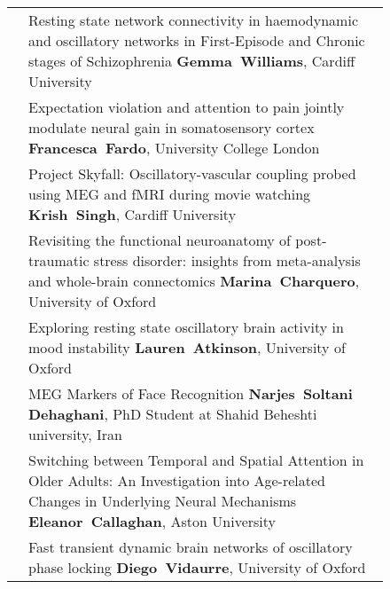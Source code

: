 \begin{figure}[htp]
\begin{tabularx}{\textwidth}{lp{.92\linewidth}}
\cellcolor{set2!50}{\bf A-31} & {\footnotesize Resting state network connectivity in haemodynamic and oscillatory networks in First-Episode and Chronic stages of Schizophrenia
} {\bf\footnotesize Gemma~Williams}, {\footnotesize Cardiff University}  \\
\cellcolor{set1!50}{\bf A-32} & {\footnotesize Expectation violation and attention to pain jointly modulate neural gain in somatosensory cortex} {\bf\footnotesize Francesca~Fardo}, {\footnotesize University College London}  \\
\cellcolor{set1!50}{\bf A-33} & {\footnotesize Project Skyfall: Oscillatory-vascular coupling probed using MEG and fMRI during movie watching} {\bf\footnotesize Krish~Singh}, {\footnotesize Cardiff University}  \\
\cellcolor{set2!50}{\bf A-34} & {\footnotesize Revisiting the functional neuroanatomy of post-traumatic stress disorder: insights from meta-analysis and whole-brain connectomics} {\bf\footnotesize Marina~Charquero}, {\footnotesize University of Oxford}  \\
\cellcolor{set2!50}{\bf A-35} & {\footnotesize Exploring resting state oscillatory brain activity in mood instability
} {\bf\footnotesize Lauren~Atkinson}, {\footnotesize University of Oxford}  \\
\cellcolor{set1!50}{\bf A-36} & {\footnotesize MEG Markers of Face Recognition
} {\bf\footnotesize Narjes~Soltani Dehaghani}, {\footnotesize PhD Student at Shahid Beheshti university, Iran}  \\
\cellcolor{set1!50}{\bf A-37} & {\footnotesize Switching between Temporal and Spatial Attention in Older Adults: An Investigation into Age-related Changes in Underlying Neural Mechanisms
} {\bf\footnotesize Eleanor~Callaghan}, {\footnotesize Aston University}  \\
\cellcolor{set3!50}{\bf A-38} & {\footnotesize Fast transient dynamic brain networks of oscillatory phase locking 
} {\bf\footnotesize Diego~Vidaurre}, {\footnotesize University of Oxford}  \\
\bottomrule
\end{tabularx}
\end{figure}
